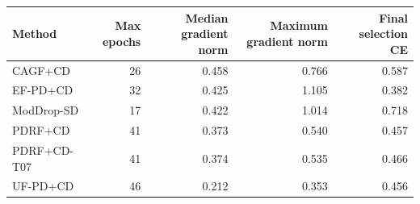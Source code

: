 \begin{tabular}{lrrrr}
\toprule
Method & Max epochs & Median gradient norm & Maximum gradient norm & Final selection CE \\
\midrule
CAGF+CD & 26 & 0.458 & 0.766 & 0.587 \\
EF-PD+CD & 32 & 0.425 & 1.105 & 0.382 \\
ModDrop-SD & 17 & 0.422 & 1.014 & 0.718 \\
PDRF+CD & 41 & 0.373 & 0.540 & 0.457 \\
PDRF+CD-T07 & 41 & 0.374 & 0.535 & 0.466 \\
UF-PD+CD & 46 & 0.212 & 0.353 & 0.456 \\
\bottomrule
\end{tabular}